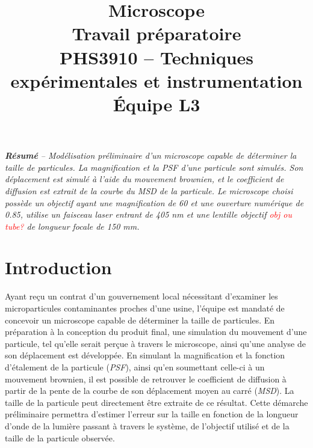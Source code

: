 \documentclass[conference]{IEEEtran}
\begin{document}
\title{Microscope\\
\large Travail préparatoire \\
PHS3910 -- Techniques expérimentales et instrumentation\\ 
Équipe L3}

\author{
\and
{}
\and
{}
\and
{}
}

\maketitle

\textit{\textbf{Résumé} -- Modélisation préliminaire d'un microscope capable de déterminer la taille de 
particules. La magnification et la PSF d'une particule sont simulés. Son déplacement est simulé à l'aide du
mouvement brownien, et le coefficient de diffusion est extrait de la courbe du MSD de la particule. Le microscope choisi 
possède un objectif ayant une magnification de 60 et une ouverture numérique de 0.85, utilise un faisceau laser entrant de 405 nm et une lentille objectif \textcolor{red}{obj ou tube?}
de longueur focale de 150 mm.}
\section{Introduction}
Ayant reçu un contrat d'un gouvernement local nécessitant d'examiner les microparticules contaminantes proches d'une
usine, l'équipe est mandaté de concevoir un microscope capable de déterminer la taille de particules. En préparation à la conception
du produit final, une simulation du mouvement d'une particule, tel qu'elle serait perçue à travers le microscope, ainsi qu'une
analyse de son déplacement est développée. En simulant la magnification et la fonction d'étalement de la particule (\textit{PSF}), ainsi qu'en soumettant
celle-ci à un mouvement brownien, il est possible
de retrouver le coefficient de diffusion à partir de la pente de la courbe de son déplacement moyen au carré (\textit{MSD}).
La taille de la particule peut directement être extraite de ce résultat. Cette démarche préliminaire permettra
d'estimer l'erreur sur la taille en fonction de la longueur d'onde de la lumière passant à travers le système, de l'objectif utilisé et de la 
taille de la particule observée.
\end{document}
